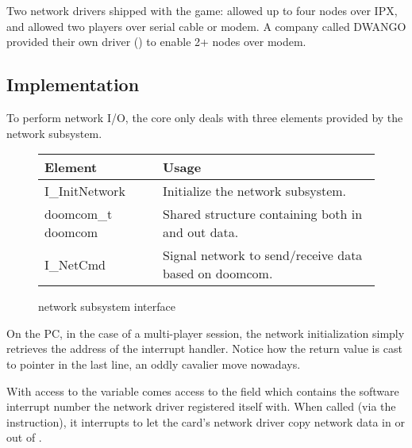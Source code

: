 Two network drivers shipped with the game:  allowed up to four nodes over IPX, and  allowed two players over serial cable or modem. A company called DWANGO provided their own driver () to enable 2+ nodes over modem.





\vspace{-5pt}
\subsection{Implementation}
To perform network I/O, the core only deals with three elements provided by the network subsystem.\\
\par
 \begin{figure}[H]
\centering  
\begin{tabularx}{\textwidth}{ L{0.6}  L{1.4}}
  \toprule
  \textbf{Element} &  \textbf{Usage}\\

  \toprule 
   I\_InitNetwork & Initialize the network subsystem.\\
   doomcom\_t doomcom & Shared structure containing both in and out data.\\
   I\_NetCmd & Signal network to send/receive data based on doomcom.\\
   \toprule
\end{tabularx}
\caption{\doom{} network subsystem interface}
\end{figure}


\vspace{-10pt}
On the PC, in the case of a multi-player session, the network initialization simply retrieves the address of the interrupt handler. Notice how the  return value is cast to pointer in the last line, an oddly cavalier move nowadays.\\
\par











With access to the  variable comes access to the field  which contains the software interrupt number the \doom{} network driver registered itself with. When called (via the  instruction), it interrupts \doom{} to let the card's network driver copy network data in or out of .\\




